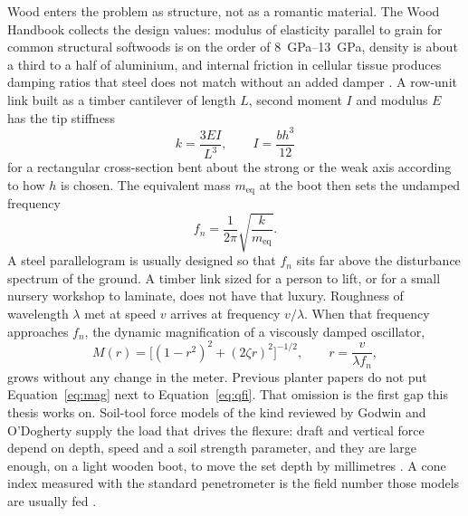 Wood enters the problem as structure, not as a romantic material. The Wood Handbook collects the design values: modulus of elasticity parallel to grain for common structural softwoods is on the order of \SIrange{8}{13}{GPa}, density is about a third to a half of aluminium, and internal friction in cellular tissue produces damping ratios that steel does not match without an added damper \cite{woodhandbook}. A row-unit link built as a timber cantilever of length \(L\), second moment \(I\) and modulus \(E\) has the tip stiffness
\begin{equation}
\label{eq:cantilever}
k = \frac{3EI}{L^3},\qquad I = \frac{bh^3}{12}
\end{equation}
for a rectangular cross-section bent about the strong or the weak axis according to how \(h\) is chosen. The equivalent mass \(m_{\mathrm{eq}}\) at the boot then sets the undamped frequency
\begin{equation}
\label{eq:fn}
f_n = \frac{1}{2\pi}\sqrt{\frac{k}{m_{\mathrm{eq}}}}.
\end{equation}
A steel parallelogram is usually designed so that \(f_n\) sits far above the disturbance spectrum of the ground. A timber link sized for a person to lift, or for a small nursery workshop to laminate, does not have that luxury. Roughness of wavelength \(\lambda\) met at speed \(v\) arrives at frequency \(v/\lambda\). When that frequency approaches \(f_n\), the dynamic magnification of a viscously damped oscillator,
\begin{equation}
\label{eq:mag}
M(r) = \bigl[(1-r^2)^2 + (2\zeta r)^2\bigr]^{-1/2},\qquad r = \frac{v}{\lambda f_n},
\end{equation}
grows without any change in the meter. Previous planter papers do not put Equation~\eqref{eq:mag} next to Equation~\eqref{eq:qfi}. That omission is the first gap this thesis works on. Soil-tool force models of the kind reviewed by Godwin and O'Dogherty supply the load that drives the flexure: draft and vertical force depend on depth, speed and a soil strength parameter, and they are large enough, on a light wooden boot, to move the set depth by millimetres \cite{godwin2007}. A cone index measured with the standard penetrometer is the field number those models are usually fed \cite{asabe313}.

